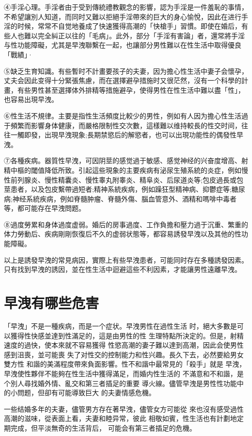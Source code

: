 \documentclass[12pt,UTF8]{ctexbook}
\begin{document}
④手淫心理。手淫者由于受到傳統禮教觀念的影響，認为手淫是一件羞恥的事情，不希望讓別人知道，而同时又難以拒絕手淫帶來的巨大的身心愉悅，因此在进行手淫的时候，常常不自觉地養成了快速獲得高潮的「快槍手」習慣。即使在婚后，有些人也難以完全糾正以往的「毛病」。此外，部分「手淫有害論」者，還常將手淫与性功能障礙，尤其是早洩聯繫在一起，也讓部分男性難以在性生活中取得優良「戰績」·

⑤缺乏生育知識。有些暫时不計畫要孩子的夫妻，因为擔心性生活中妻子会懷孕，丈夫会因此变得十分緊張焦慮，而在選擇避孕措施时又很茫然，沒有一个科學的計畫，有些男性甚至選擇体外排精等措施避孕，使得男性在性生活中難以盡「性」，也容易出現早洩。

⑥性生活不規律。主要是指性生活頻度比較少的男性，例如有人因为擔心性生活過于頻繁而影響身体健康，而嚴格限制性交次數，這樣難以维持較長的性交时间，往往一觸即發，出現早洩現象;長期禁慾后的解慾者，也可以出現功能性的偶發性早洩。

⑦各種疾病。器質性早洩，可因阴莖的感觉過于敏感、感觉神经的兴奋度增高、射精中樞的閾值降低所致。引起這些現象的主要疾病有泌尿生殖系統的炎症，例如慢性前列腺炎、慢性精囊炎、慢性睾丸附睾炎、精阜炎、后尿道炎等;包皮過長或包莖患者，以及包皮繫帶過短者;精神系統疾病，例如躁狂型精神病、抑鬱症等;糖尿病;神经系統疾病，例如脊髓肿瘤、脊髓外傷、腦血管意外、酒精和嗎啡中毒者等，都可能存在早洩問题。

⑧過度勞累和身体過度虚弱。婚后的房事過度、工作負擔和壓力過于沉重、繁重的体力勞動后、疾病剛剛恢復后不久的虚弱状態等，都容易誘發早洩以及其他的性功能障礙。

以上是誘發早洩的常見病因，實際上有些早洩患者，可能同时存在多種誘發因素。只有找到早洩的誘因，並在性生活中迴避這些不利因素，才能讓男性遠離早洩。

\section{早洩有哪些危害}

「早洩」不是一種疾病，而是一个症状。早洩男性在過性生活
时，絕大多數是可以獲得性快感並達到性滿足的，這是由男性的性
生理特點所決定的。但是，射精速度的過快，使本來就不容易獲得
性慾高潮的妻子難以達到高潮，因此会使男性感到沮喪，並可能喪
失了对性交的控制能力和性兴趣。長久下去，必然要給男女雙方性
和諧的美滿程度帶來負面影響。性不和諧中最常見的「殺手」就是
早洩，早洩使性夥伴不能夠在性生活中獲得滿足，而婚内性生活的
不滿意和不和諧，是个別人尋找婚外情、亂交和第三者插足的重要
導火線。儘管早洩是男性性功能中的小問题，但卻有可能導致巨大
的夫妻情感危機。

一些结婚多年的夫妻，儘管男方存在著早洩，儘管女方可能從
來也沒有感受過性高潮的滋味，從表面上看，夫妻和睦异常，彼此
相敬如賓，性生活也有計劃地定期完成，但平淡無奇的生活背后，
可能会有第三者插足的危機。
\end{document}
